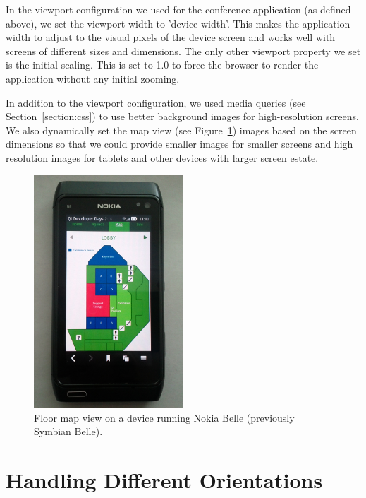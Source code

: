 In the viewport configuration we used for the conference application
(as defined above), we set the viewport width to 'device-width'. This
makes the application width to adjust to the visual pixels of the
device screen and works well with screens of different sizes and
dimensions. The only other viewport property we set is the initial
scaling. This is set to 1.0 to force the browser to render the
application without any initial zooming.

In addition to the viewport configuration, we used media queries (see
Section~\ref{section:css}) to use better background images for
high-resolution screens. We also dynamically set the map view (see
Figure~\ref{figure:nokia-map.jpg}) images based on the screen
dimensions so that we could provide smaller images for smaller screens
and high resolution images for tablets and other devices with larger
screen estate.

\begin{figure}[ht]
  \begin{center}
    \includegraphics[width=0.5\textwidth]{images/nokia-map.jpg}
    \caption{Floor map view on a device running Nokia Belle
      (previously Symbian Belle).}
    \label{figure:nokia-map.jpg}
  \end{center}
\end{figure}

\section{Handling Different Orientations}

